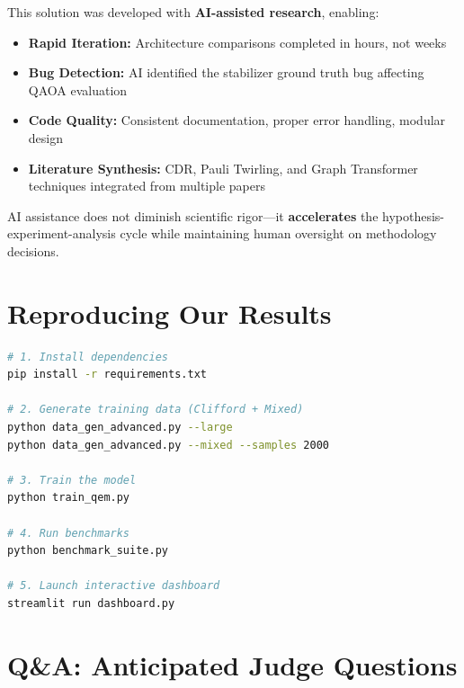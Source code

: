 \documentclass[11pt, a4paper]{article}
\begin{document}
This solution was developed with \textbf{AI-assisted research}, enabling:

\begin{itemize}
    \item \textbf{Rapid Iteration:} Architecture comparisons completed in hours, not weeks
    \item \textbf{Bug Detection:} AI identified the stabilizer ground truth bug affecting QAOA evaluation
    \item \textbf{Code Quality:} Consistent documentation, proper error handling, modular design
    \item \textbf{Literature Synthesis:} CDR, Pauli Twirling, and Graph Transformer techniques integrated from multiple papers
\end{itemize}

\begin{keyinsight}
AI assistance does not diminish scientific rigor---it \textbf{accelerates} the hypothesis-experiment-analysis cycle while maintaining human oversight on methodology decisions.
\end{keyinsight}

\section{Reproducing Our Results}

\begin{lstlisting}[language=bash, caption=Reproduction Commands]
# 1. Install dependencies
pip install -r requirements.txt

# 2. Generate training data (Clifford + Mixed)
python data_gen_advanced.py --large
python data_gen_advanced.py --mixed --samples 2000

# 3. Train the model
python train_qem.py

# 4. Run benchmarks
python benchmark_suite.py

# 5. Launch interactive dashboard
streamlit run dashboard.py
\end{lstlisting}

\section{Q\&A: Anticipated Judge Questions}
\end{document}
